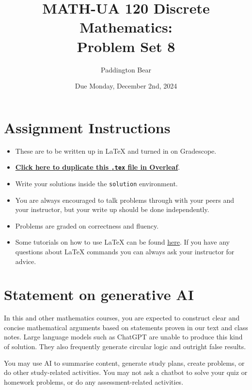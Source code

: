 \documentclass{article}
\title{\textbf{MATH-UA 120 Discrete Mathematics: \\ Problem Set 8}}
\author{%
    Paddington Bear %
}
\date{Due Monday, December 2nd, 2024} %
\theoremstyle{definition}
\begin{document}
\maketitle %

\vfill

\section*{Assignment Instructions}

\begin{itemize}
    \item These are to be written up in \LaTeX{} and turned in on Gradescope.
    \item \href{https://bit.ly/4dWlKX0}{\textbf{Click here to duplicate this \texttt{.tex} file in Overleaf}}.
    \item Write your solutions inside the \texttt{solution} environment.
    \item You are always encouraged to talk problems through with your peers and your instructor, but your write up should be done independently.
    \item Problems are graded on correctness and fluency.
    \item Some tutorials on how to use \LaTeX{} can be found \href{https://www.overleaf.com/learn/latex/Tutorials}{\underline{here}}. If you have any questions about \LaTeX{} commands you can always ask your instructor for advice.
\end{itemize}

\vfill

\section*{Statement on generative AI}

In this and other mathematics courses, you are expected to construct clear and concise mathematical arguments based on statements proven in our text and class notes. Large language models such as ChatGPT are unable to produce this kind of solution. They also frequently generate circular logic and outright false results.
 
You may use AI to summarise content, generate study plans, create problems, or do other study-related activities. You may not ask a chatbot to solve your quiz or homework problems, or do any assessment-related activities.
 
\end{document}
